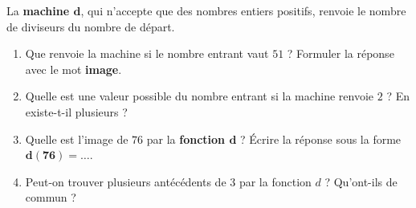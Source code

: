 \begin{exercice}
    La \textbf{machine $\boldsymbol{d}$}, qui n'accepte que des nombres entiers positifs, renvoie le nombre de diviseurs du nombre de départ.
    \begin{center}
    \end{center}
    \vspace*{-5mm} 
  \begin{enumerate}
    \item Que renvoie la machine si le nombre entrant vaut $51$ ? Formuler la réponse avec le mot \textbf{image}.
    \item Quelle est une valeur possible du nombre entrant si la machine renvoie  $2$ ? En existe-t-il plusieurs ?
    \item Quelle est l'image de $76$ par la \textbf{fonction $\boldsymbol{d}$} ? Écrire la réponse sous la forme $\boldsymbol{d(76)=\ldots}$.
    \item Peut-on trouver plusieurs antécédents de 3 par la fonction $d$ ? Qu'ont-ils de commun ?
\end{enumerate}

\end{exercice}

